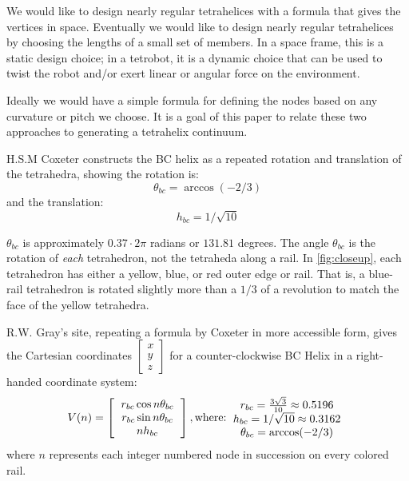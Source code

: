 \documentclass[review]{siamonline1116}
\begin{document}
We would like to design nearly regular tetrahelices with a formula that
gives the vertices in space. Eventually we would like to design nearly regular
tetrahelices by choosing the lengths of a small set of members.
In a space frame, this is a static design choice; in a tetrobot, it is a
dynamic choice that can be used to twist the robot and/or exert linear or
angular force on the environment.

Ideally we would have a simple formula for defining the nodes based on
any curvature or pitch we choose. It is a goal of
this paper to relate these two approaches to generating a tetrahelix
continuum.


H.S.M Coxeter constructs the BC helix\cite{coxeter1985simplicial} as a repeated rotation and translation of the tetrahedra, showing the
rotation is:
\[
\theta_{bc} = \arccos(-2/3) 
\]
and the translation:
\[
h_{bc} = 1/\sqrt{10}
\]

$\theta_{bc}$ is approximately $0.37 \cdot 2 \pi$ radians or  $131.81$ degrees.
The angle $\theta_{bc}$ is the rotation of \emph{each} tetrahedron, not the tetraheda along a rail.  In \cref{fig:closeup},
each tetrahedron has either a yellow, blue, or red outer edge or rail.
That is, a blue-rail tetrahedron is rotated slightly more than a $1/3$ of a revolution to match the face of the yellow tetrahedra.

R.W. Gray's site\cite{graytetrahelix}, repeating a formula by Coxeter\cite{coxeter1985simplicial} in more accessible form, gives the Cartesian coordinates $\begin{bmatrix}
           x \\
           y \\
           z
         \end{bmatrix}$
for a counter-clockwise BC Helix in a right-handed coordinate system:
\begin{equation}
  \label{graycoxeter}
V(n) =
\left [
  \begin{tabular}{c}
   $ r_{bc} \cos{n \theta_{bc}} $\\
   $ r_{bc} \sin{n \theta_{bc}} $\\
   $ n h_{bc}  $
  \end{tabular}
  \right ],
\text{where:}
  \begin{tabular}{c}
 $ r_{bc} = \frac{3\sqrt{3}}{10} \approx 0.5196 $\\
 $ h_{bc} = 1/\sqrt{10} \approx 0.3162 $ \\
 $ \theta_{bc} = \arccos(-2/3) $ \\
  \end{tabular}      
\end{equation}
where $n$ represents each integer numbered node in succession on every colored rail.
\end{document}
